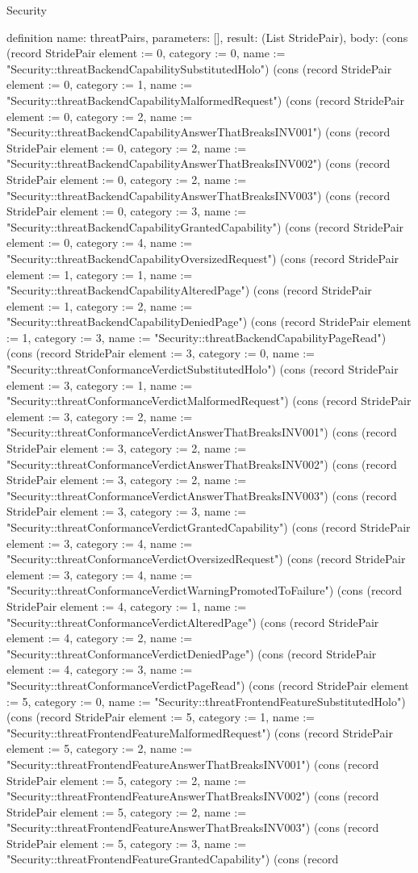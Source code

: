 \begin{lexlean}{Security}
\begin{semanticmodule}
definition{
  name: threatPairs,
  parameters: [],
  result: (List StridePair),
  body: (cons (record StridePair {element := 0, category := 0, name := "Security::threatBackendCapabilitySubstitutedHolo"}) (cons (record StridePair {element := 0, category := 1, name := "Security::threatBackendCapabilityMalformedRequest"}) (cons (record StridePair {element := 0, category := 2, name := "Security::threatBackendCapabilityAnswerThatBreaksINV001"}) (cons (record StridePair {element := 0, category := 2, name := "Security::threatBackendCapabilityAnswerThatBreaksINV002"}) (cons (record StridePair {element := 0, category := 2, name := "Security::threatBackendCapabilityAnswerThatBreaksINV003"}) (cons (record StridePair {element := 0, category := 3, name := "Security::threatBackendCapabilityGrantedCapability"}) (cons (record StridePair {element := 0, category := 4, name := "Security::threatBackendCapabilityOversizedRequest"}) (cons (record StridePair {element := 1, category := 1, name := "Security::threatBackendCapabilityAlteredPage"}) (cons (record StridePair {element := 1, category := 2, name := "Security::threatBackendCapabilityDeniedPage"}) (cons (record StridePair {element := 1, category := 3, name := "Security::threatBackendCapabilityPageRead"}) (cons (record StridePair {element := 3, category := 0, name := "Security::threatConformanceVerdictSubstitutedHolo"}) (cons (record StridePair {element := 3, category := 1, name := "Security::threatConformanceVerdictMalformedRequest"}) (cons (record StridePair {element := 3, category := 2, name := "Security::threatConformanceVerdictAnswerThatBreaksINV001"}) (cons (record StridePair {element := 3, category := 2, name := "Security::threatConformanceVerdictAnswerThatBreaksINV002"}) (cons (record StridePair {element := 3, category := 2, name := "Security::threatConformanceVerdictAnswerThatBreaksINV003"}) (cons (record StridePair {element := 3, category := 3, name := "Security::threatConformanceVerdictGrantedCapability"}) (cons (record StridePair {element := 3, category := 4, name := "Security::threatConformanceVerdictOversizedRequest"}) (cons (record StridePair {element := 3, category := 4, name := "Security::threatConformanceVerdictWarningPromotedToFailure"}) (cons (record StridePair {element := 4, category := 1, name := "Security::threatConformanceVerdictAlteredPage"}) (cons (record StridePair {element := 4, category := 2, name := "Security::threatConformanceVerdictDeniedPage"}) (cons (record StridePair {element := 4, category := 3, name := "Security::threatConformanceVerdictPageRead"}) (cons (record StridePair {element := 5, category := 0, name := "Security::threatFrontendFeatureSubstitutedHolo"}) (cons (record StridePair {element := 5, category := 1, name := "Security::threatFrontendFeatureMalformedRequest"}) (cons (record StridePair {element := 5, category := 2, name := "Security::threatFrontendFeatureAnswerThatBreaksINV001"}) (cons (record StridePair {element := 5, category := 2, name := "Security::threatFrontendFeatureAnswerThatBreaksINV002"}) (cons (record StridePair {element := 5, category := 2, name := "Security::threatFrontendFeatureAnswerThatBreaksINV003"}) (cons (record StridePair {element := 5, category := 3, name := "Security::threatFrontendFeatureGrantedCapability"}) (cons (record }
\end{semanticmodule}
\end{lexlean}
